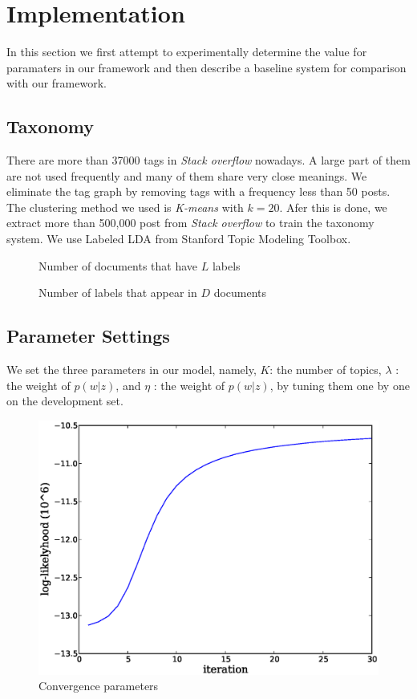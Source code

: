 \vfill\eject
\section{Implementation}
\label{sec:implement}
In this section we first attempt to experimentally determine the value for
paramaters in our framework and then describe a baseline system for comparison
with our framework.
\subsection{Taxonomy}
There are more than 37000 tags in {\it Stack overflow} nowadays. A large part
of them are not used frequently and many of them share very close meanings.
We eliminate the tag graph by removing tags with a frequency less than 50 posts.
The clustering method we used is {\it K-means} with $k=20$. Afer this is done,
we extract more than 500,000 post from {\it Stack overflow} to train the taxonomy
system. We use Labeled LDA from Stanford Topic Modeling Toolbox.
\begin{figure}[h]
\centering
\label{fig:labelperdoc}
\caption{Number of documents that have $L$ labels}
\end{figure}

\begin{figure}[h]
\centering
\label{fig:docperlabel}
\caption{Number of labels that appear in $D$ documents}
\end{figure}

\subsection{Parameter Settings}
\label{sec:config}
We set the three parameters in our model, namely, $K$: the number
of topics, $\lambda$ : the weight of $p(w|z)$, and $\eta$ : the weight of $p(w|z)$, by
tuning them one by one on the development set.

\begin{figure}[h]
\begin{center}
\includegraphics[width=0.7\columnwidth]{figure/likelyhood.eps}
\caption{Convergence parameters}
\label{fig:conv}
\end{center}
\end{figure}
